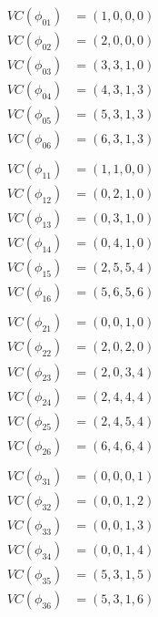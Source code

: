 \begin{align*}
VC(\phi_{01})&=(1,0,0,0)\\
VC(\phi_{02})&=(2,0,0,0)\\
VC(\phi_{03})&=(3,3,1,0)\\
VC(\phi_{04})&=(4,3,1,3)\\
VC(\phi_{05})&=(5,3,1,3)\\
VC(\phi_{06})&=(6,3,1,3)\\
\\
VC(\phi_{11})&=(1,1,0,0)\\
VC(\phi_{12})&=(0,2,1,0)\\
VC(\phi_{13})&=(0,3,1,0)\\
VC(\phi_{14})&=(0,4,1,0)\\
VC(\phi_{15})&=(2,5,5,4)\\
VC(\phi_{16})&=(5,6,5,6)\\
\\
VC(\phi_{21})&=(0,0,1,0)\\
VC(\phi_{22})&=(2,0,2,0)\\
VC(\phi_{23})&=(2,0,3,4)\\
VC(\phi_{24})&=(2,4,4,4)\\
VC(\phi_{25})&=(2,4,5,4)\\
VC(\phi_{26})&=(6,4,6,4)\\
\\
VC(\phi_{31})&=(0,0,0,1)\\
VC(\phi_{32})&=(0,0,1,2)\\
VC(\phi_{33})&=(0,0,1,3)\\
VC(\phi_{34})&=(0,0,1,4)\\
VC(\phi_{35})&=(5,3,1,5)\\
VC(\phi_{36})&=(5,3,1,6)\\
\end{align*}